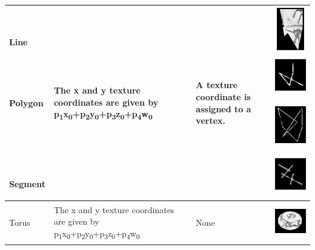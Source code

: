 \documentclass[letterpaper]{article}
\begin{document}
\begin{center}
\begin{xtabular}{|m{0.7400598in}|m{3.2761598in}|m{0.99975985in}|m{0.7483598in}|}
~

{ Line}

~

~

{ Polygon}

~

~

~

{ Segment} &
{ The x and y texture coordinates are given by
p\textsubscript{1}x\textsubscript{0}+p\textsubscript{2}y\textsubscript{0}+p\textsubscript{3}z\textsubscript{0}+p\textsubscript{4}w\textsubscript{0}
} &
{ A texture coordinate is assigned to a vertex. } &
 \includegraphics[width=0.6602in,height=0.7335in]{utr9/utr9-img016.jpg} 
 \includegraphics[width=0.7228in,height=0.7516in]{utr9/utr9-img017.jpg} 
 \includegraphics[width=0.7217in,height=0.8717in]{utr9/utr9-img018.jpg} 
 \includegraphics[width=0.7228in,height=0.7402in]{utr9/utr9-img019.jpg} \\\hline
 Torus &
{ The x and y texture coordinates are given by
p\textsubscript{1}x\textsubscript{0}+p\textsubscript{2}y\textsubscript{0}+p\textsubscript{3}z\textsubscript{0}+p\textsubscript{4}w\textsubscript{0}}
&
 None &
 \includegraphics[width=0.8016in,height=0.645in]{utr9/utr9-img020.jpg} \\\hline
\end{xtabular}
\end{center}
\end{document}
